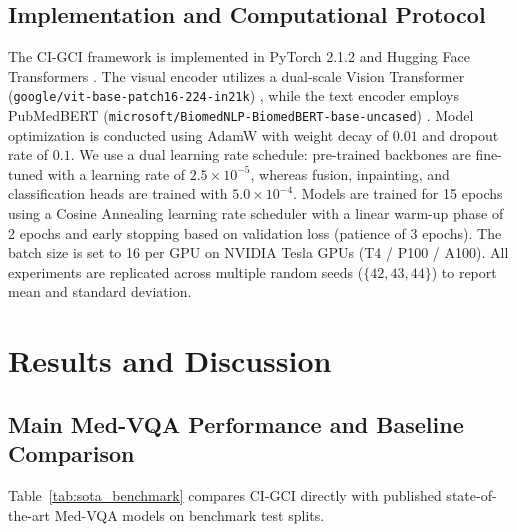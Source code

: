 \documentclass[journal,twoside,web]{ieeecolor}
\begin{document}
\subsection{Implementation and Computational Protocol}
The CI-GCI framework is implemented in PyTorch 2.1.2 \cite{paszke2019pytorch} and Hugging Face Transformers \cite{wolf2020transformers}. The visual encoder utilizes a dual-scale Vision Transformer (\texttt{google/vit-base-patch16-224-in21k}) \cite{dosovitskiy2020vit}, while the text encoder employs PubMedBERT (\texttt{microsoft/BiomedNLP-BiomedBERT-base-uncased}) \cite{gu2021}. Model optimization is conducted using AdamW \cite{loshchilov2018adamw} with weight decay of $0.01$ and dropout rate of $0.1$. We use a dual learning rate schedule: pre-trained backbones are fine-tuned with a learning rate of $2.5 \times 10^{-5}$, whereas fusion, inpainting, and classification heads are trained with $5.0 \times 10^{-4}$. Models are trained for 15 epochs using a Cosine Annealing learning rate scheduler with a linear warm-up phase of 2 epochs and early stopping based on validation loss (patience of 3 epochs). The batch size is set to 16 per GPU on NVIDIA Tesla GPUs (T4 / P100 / A100). All experiments are replicated across multiple random seeds ($\{42, 43, 44\}$) to report mean and standard deviation.

\section{Results and Discussion}
\label{sec:results}

\subsection{Main Med-VQA Performance and Baseline Comparison}
Table~\ref{tab:sota_benchmark} compares CI-GCI directly with published state-of-the-art Med-VQA models on benchmark test splits.
\end{document}
